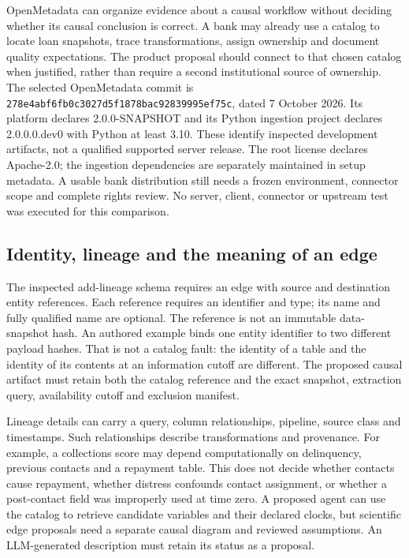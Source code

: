OpenMetadata can organize evidence about a causal workflow without deciding
whether its causal conclusion is correct. A bank may already use a catalog to
locate loan snapshots, trace transformations, assign ownership and document
quality expectations. The product proposal should connect to that chosen
catalog when justified, rather than require a second institutional source of
ownership. The selected OpenMetadata commit is
\texttt{278e4abf6fb0c3027d5f1878bac92839995ef75c}, dated 7 October 2026.
Its platform declares 2.0.0-SNAPSHOT and its Python ingestion project declares
2.0.0.0.dev0 with Python at least 3.10. These identify inspected development
artifacts, not a qualified supported server release. The root license declares
Apache-2.0; the ingestion dependencies are separately maintained in setup
metadata. A usable bank distribution still needs a frozen environment, connector
scope and complete rights review. No server, client, connector or upstream test
was executed for this comparison.~\citep{exec24_openmetadata_source}

\subsection{Identity, lineage and the meaning of an edge}

The inspected add-lineage schema requires an edge with source and destination
entity references. Each reference requires an identifier and type; its name and
fully qualified name are optional. The reference is not an immutable data-snapshot
hash. An authored example binds one entity identifier to two different payload
hashes. That is not a catalog fault: the identity of a table and the identity of
its contents at an information cutoff are different. The proposed causal artifact
must retain both the catalog reference and the exact snapshot, extraction
query, availability cutoff and exclusion manifest.~\citep{exec24_openmetadata_source,exec24_openmetadata_reference}

Lineage details can carry a query, column relationships, pipeline, source class
and timestamps. Such relationships describe transformations and provenance.
For example, a collections score may depend computationally on delinquency,
previous contacts and a repayment table. This does not decide whether contacts
cause repayment, whether distress confounds contact assignment, or whether a
post-contact field was improperly used at time zero. A proposed agent can use
the catalog to retrieve candidate variables and their declared clocks, but
scientific edge proposals need a separate causal diagram and reviewed assumptions.
An LLM-generated description must retain its status as a proposal.
\citep{exec24_openmetadata_source}

